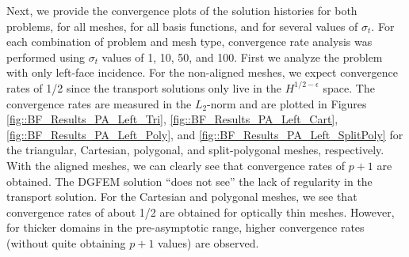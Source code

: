Next, we provide the convergence plots of the solution histories for both problems, for all meshes, for all basis functions, and for several values of $\sigma_t$. For each combination of problem and mesh type, convergence rate analysis was performed using $\sigma_t$ values of 1, 10, 50, and 100. First we analyze the problem with only left-face incidence. For the non-aligned meshes, we expect convergence rates of 1/2 since the transport solutions only live in the $H^{1/2-\epsilon}$ space. The convergence rates are measured in the $L_2$-norm and are plotted in Figures \ref{fig::BF_Results_PA_Left_Tri}, \ref{fig::BF_Results_PA_Left_Cart}, \ref{fig::BF_Results_PA_Left_Poly}, and \ref{fig::BF_Results_PA_Left_SplitPoly} for the triangular, Cartesian, polygonal, and split-polygonal meshes, respectively. With the aligned meshes, we can clearly see that convergence rates of $p+1$ are obtained. The DGFEM solution ``does not see'' the lack of regularity in the transport solution. For the Cartesian and polygonal meshes, we see that convergence rates of about 1/2 are obtained for optically thin meshes. However, for thicker domains in the pre-asymptotic range, higher convergence rates (without quite obtaining $p+1$ values) are observed.

